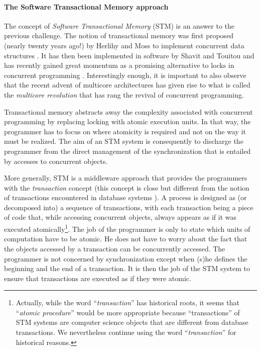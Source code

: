 \paragraph{The Software Transactional Memory approach}
The concept of {\it Software Transactional  Memory}   (STM)  is  an answer  
to   the  previous  challenge.   The notion  of   transactional  memory  was
first   proposed  (nearly twenty years ago!) by Herlihy  and Moss to 
implement concurrent  data structures  \cite{HM93}.  It  has  then  been 
implemented in software  by Shavit  and  Touitou   \cite{ST97} and  has
recently gained great  momentum as  a promising alternative  to locks in
concurrent programming  \cite{FFGH08,H07,LK08,R08}. Interestingly  enough,  
it is important to also observe that the recent advent of multicore 
architectures has  given rise to what is called the {\it multicore  
revolution} \cite{HL08} that has  rang the revival of concurrent programming. 



Transactional  memory   abstracts away the  complexity associated with 
concurrent programming    by  replacing locking  with  atomic
execution units. In  that way, the programmer has to focus on  where 
atomicity is required and  not on the  way it must be realized. The aim of
an STM system is consequently  to  discharge the programmer from the direct 
management of the synchronization that is entailed by  accesses  to concurrent  objects. 

More generally,  STM  is a middleware approach that provides the 
programmers  with the {\it transaction} concept (this concept 
is close but different from the notion of transactions encountered in 
database systems \cite{FFGH08}). A process is designed as 
(or decomposed into)  a sequence of transactions, with each transaction 
being a piece  of code that, while  accessing  concurrent  objects, 
always  appears as if it was  executed atomically\footnote{Actually,  
while the word {``\it transaction}'' has historical roots, it seems that 
{``\it atomic procedure}'' would be more appropriate because 
``transactions''  of STM systems are  computer science objects 
that are different  from database transactions.  We nevertheless 
continue using the word  {``\it transaction}'' for historical reasons.}.
The job of the programmer is only to state which  units of computation
have  to be atomic.  He does not have to worry about the fact that the 
objects accessed by  a transaction can be concurrently accessed. 
The programmer is not concerned by synchronization
except when (s)he defines the beginning and the end of a  transaction.
It  is then the job of the 
STM system to ensure that transactions are executed as if they were atomic. 



